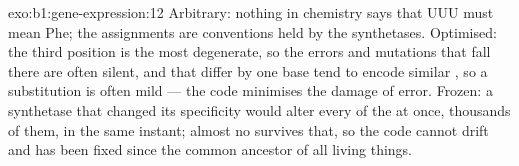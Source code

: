 \begin{solution}{exo:b1:gene-expression:12}
Arbitrary: nothing in chemistry says that UUU must mean Phe; the
assignments are conventions held by the synthetases. Optimised: the
third position is the most degenerate, so the errors and mutations
that fall there are often silent, and  that differ by one base
tend to encode similar , so a substitution is often mild
--- the code minimises the damage of error. Frozen: a synthetase
that changed its specificity would alter every  of the  at
once, thousands of them, in the same instant; almost no  survives
that, so the code cannot drift and has been fixed since the common
ancestor of all living things.
\end{solution}

